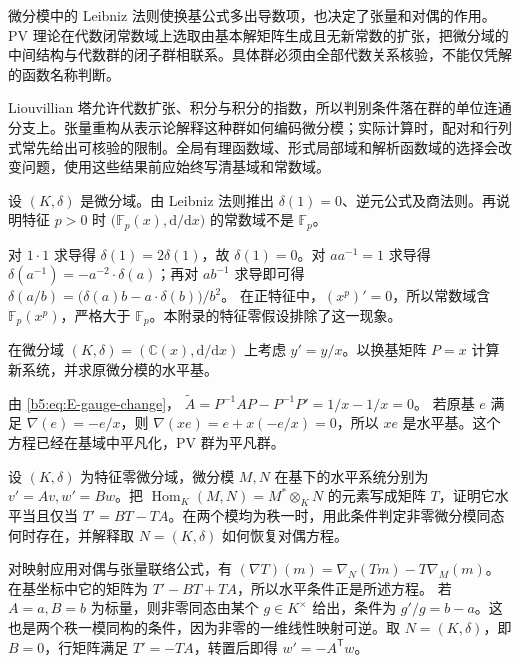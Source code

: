 




\begin{chaptersummary}
	微分模中的 Leibniz 法则使换基公式多出导数项，也决定了张量和对偶的作用。PV 理论在代数闭常数域上选取由基本解矩阵生成且无新常数的扩张，把微分域的中间结构与代数群的闭子群相联系。具体群必须由全部代数关系核验，不能仅凭解的函数名称判断。

	\ProseParagraphBreak
	Liouvillian 塔允许代数扩张、积分与积分的指数，所以判别条件落在群的单位连通分支上。张量重构从表示论解释这种群如何编码微分模；实际计算时，配对和行列式常先给出可核验的限制。全局有理函数域、形式局部域和解析函数域的选择会改变问题，使用这些结果前应始终写清基域和常数域。
\end{chaptersummary}

\BookExercises

\begin{exercise}
	设 \((K,\delta)\) 是微分域。由 Leibniz 法则推出 \(\delta(1)=0\)、逆元公式及商法则。再说明特征 \(p>0\) 时 \(\bigl(\mathbb F_p(x),\mathrm{d}/\mathrm{d}x\bigr)\) 的常数域不是 \(\mathbb F_p\)。
\end{exercise}
\begin{solution}
	对 \(1\cdot1\) 求导得 \(\delta(1)=2\delta(1)\)，故 \(\delta(1)=0\)。对 \(aa^{-1}=1\) 求导得 \(\delta(a^{-1})=-a^{-2}\cdot\delta(a)\)；再对 \(ab^{-1}\) 求导即可得 \(\delta(a/b)=\bigl(\delta(a)b-a\cdot\delta(b)\bigr)/b^2\)。 在正特征中，\((x^p)'=0\)，所以常数域含 \(\mathbb F_p(x^p)\)，严格大于 \(\mathbb F_p\)。本附录的特征零假设排除了这一现象。
\end{solution}

\begin{exercise}
	在微分域 \((K,\delta)=(\mathbb C(x),\mathrm d/\mathrm dx)\) 上考虑 \(y'=y/x\)。以换基矩阵 \(P=x\) 计算新系统，并求原微分模的水平基。
\end{exercise}
\begin{solution}
	由 \eqref{b5:eq:E-gauge-change}， \(\widetilde A=P^{-1}AP-P^{-1}P'=1/x-1/x=0\)。 若原基 \(e\) 满足 \(\nabla(e)=-e/x\)，则 \(\nabla(xe)=e+x(-e/x)=0\)，所以 \(xe\) 是水平基。这个方程已经在基域中平凡化，PV 群为平凡群。
\end{solution}

\begin{exercise}
	设 \((K,\delta)\) 为特征零微分域，微分模 \(M,N\) 在基下的水平系统分别为 \(v'=Av,w'=Bw\)。把 \(\operatorname{Hom}_K(M,N)=M^*\otimes_KN\) 的元素写成矩阵 \(T\)，证明它水平当且仅当 \(T'=BT-TA\)。在两个模均为秩一时，用此条件判定非零微分模同态何时存在，并解释取 \(N=(K,\delta)\) 如何恢复对偶方程。
\end{exercise}
\begin{solution}
	对映射应用对偶与张量联络公式，有 \((\nabla T)(m)=\nabla_N(Tm)-T\nabla_M(m)\)。在基坐标中它的矩阵为 \(T'-BT+TA\)，所以水平条件正是所述方程。 若 \(A=a,B=b\) 为标量，则非零同态由某个 \(g\in K^\times\) 给出，条件为 \(g'/g=b-a\)。这也是两个秩一模同构的条件，因为非零的一维线性映射可逆。取 \(N=(K,\delta)\)，即 \(B=0\)，行矩阵满足 \(T'=-TA\)，转置后即得 \(w'=-A^{\mathsf T}w\)。
\end{solution}

